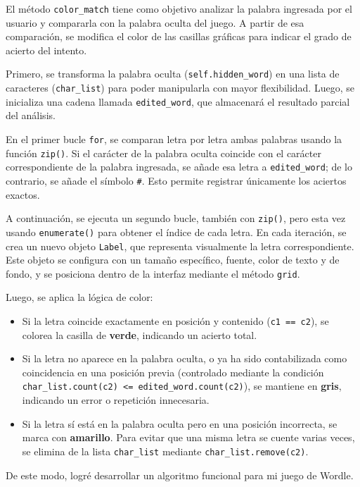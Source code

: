 \noindent El método \texttt{color\_match} tiene como objetivo analizar la palabra ingresada por el usuario y compararla con la palabra oculta del juego. A partir de esa comparación, se modifica el color de las casillas gráficas para indicar el grado de acierto del intento.

\bigskip

\noindent Primero, se transforma la palabra oculta (\texttt{self.hidden\_word}) en una lista de caracteres (\texttt{char\_list}) para poder manipularla con mayor flexibilidad. Luego, se inicializa una cadena llamada \texttt{edited\_word}, que almacenará el resultado parcial del análisis.

\bigskip

\noindent En el primer bucle \texttt{for}, se comparan letra por letra ambas palabras usando la función \texttt{zip()}. Si el carácter de la palabra oculta coincide con el carácter correspondiente de la palabra ingresada, se añade esa letra a \texttt{edited\_word}; de lo contrario, se añade el símbolo \texttt{\#}. Esto permite registrar únicamente los aciertos exactos.

\bigskip

\noindent A continuación, se ejecuta un segundo bucle, también con \texttt{zip()}, pero esta vez usando \texttt{enumerate()} para obtener el índice de cada letra. En cada iteración, se crea un nuevo objeto \texttt{Label}, que representa visualmente la letra correspondiente. Este objeto se configura con un tamaño específico, fuente, color de texto y de fondo, y se posiciona dentro de la interfaz mediante el método \texttt{grid}.

\noindent Luego, se aplica la lógica de color:

\begin{itemize}
\item Si la letra coincide exactamente en posición y contenido (\texttt{c1 == c2}), se colorea la casilla de \textbf{verde}, indicando un acierto total.
\item Si la letra no aparece en la palabra oculta, o ya ha sido contabilizada como coincidencia en una posición previa (controlado mediante la condición \texttt{char\_list.count(c2) <= edited\_word.count(c2)}), se mantiene en \textbf{gris}, indicando un error o repetición innecesaria.
\item Si la letra sí está en la palabra oculta pero en una posición incorrecta, se marca con \textbf{amarillo}. Para evitar que una misma letra se cuente varias veces, se elimina de la lista \texttt{char\_list} mediante \texttt{char\_list.remove(c2)}.
\end{itemize}

\noindent De este modo, logré desarrollar un algoritmo funcional para mi juego de Wordle.
